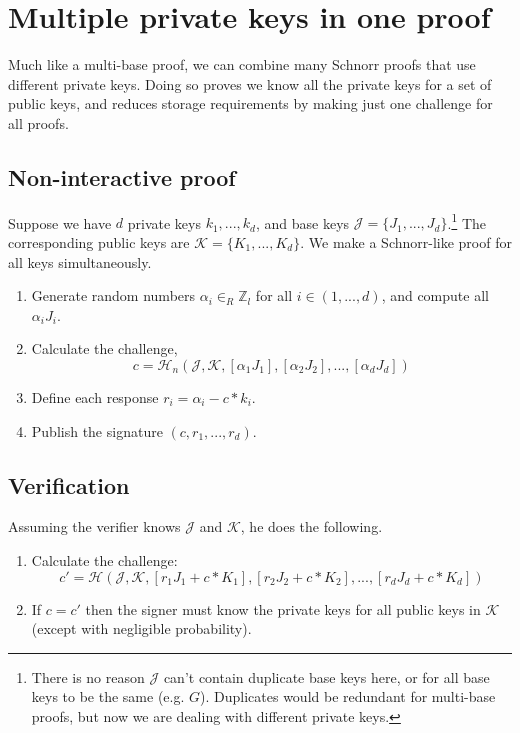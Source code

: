 \section{Multiple private keys in one proof}
\label{sec:multiple_private_keys_in_one_proof}

Much like a multi-base proof, we can combine many Schnorr proofs that use different private keys. Doing so proves we know all the private keys for a set of public keys, and reduces storage requirements by making just one challenge for all proofs.


\subsection*{Non-interactive proof}

Suppose we have $d$ private keys $k_1,...,k_d$, and base keys $\mathcal{J} = \{J_1,...,J_d\}$.\footnote{There is no reason $\mathcal{J}$ can't contain duplicate base keys here, or for all base keys to be the same (e.g. $G$). Duplicates would be redundant for multi-base proofs, but now we are dealing with different private keys.} The corresponding public keys are $\mathcal{K} = \{K_1,...,K_d\}$. We make a Schnorr-like proof for all keys simultaneously.

\begin{enumerate}
	\item Generate random numbers $\alpha_i \in_R \mathbb{Z}_l$ for all $i \in (1,...,d)$, and compute all $\alpha_i J_i$.
	\item Calculate the challenge,\vspace{.175cm}
	\[c = \mathcal{H}_n(\mathcal{J},\mathcal{K},[\alpha_1 J_1],[\alpha_2 J_2],...,[\alpha_d J_d])\]
	\item Define each response $r_i = \alpha_i - c*k_i$.
	\item Publish the signature $(c, r_1,...,r_d)$.
\end{enumerate}


\subsection*{Verification}

Assuming the verifier knows $\mathcal{J}$ and $\mathcal{K}$, he does the following.

\begin{enumerate}
	\item Calculate the challenge:\vspace{.175cm}
	\[c' = \mathcal{H}(\mathcal{J},\mathcal{K},[r_1 J_1 + c*K_1],[r_2 J_2 + c*K_2],...,[r_d J_d + c*K_d])\]
	\item If $c = c'$ then the signer must know the private keys for all public keys in $\mathcal{K}$ (except with negligible probability).
\end{enumerate}



